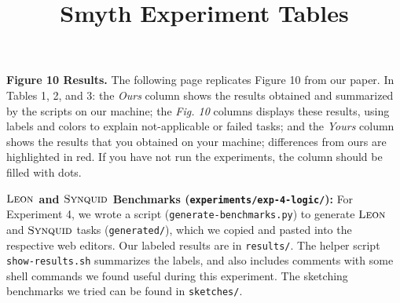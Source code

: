\documentclass[acmsmall,nonacm]{acmart}
\newcommand{\leon}
  {\ensuremath{\textsc{Leon}}}
\newcommand{\synquid}
  {\ensuremath{\textsc{Synquid}}}
\begin{document}
\title{Smyth Experiment Tables}
\maketitle

\vspace{0.30in}
\noindent
\textbf{Figure 10 Results.}
%
The following page replicates Figure 10 from our paper.
%
In Tables 1, 2, and 3:
%
the \textit{Ours} column shows the results obtained and summarized by
the scripts on our machine;
%
the \textit{Fig. 10} columns displays these results, using labels and
colors to explain not-applicable or failed tasks; and
%
the \textit{Yours} column shows the results that you obtained
on your machine; differences from ours are highlighted in red.
%
If you have not run the experiments, the column should be filled with dots.


\vspace{0.30in}
%
\noindent
%
\textbf{\leon{} and \synquid{} Benchmarks (\texttt{experiments/exp-4-logic/}):}
%
For Experiment 4, we wrote a script
%
(\texttt{generate-benchmarks.py})
%
to generate \leon{} and \synquid{} tasks
%
(\texttt{generated/}),
%
which we copied and pasted into the respective web editors.
%
Our labeled results are in \texttt{results/}.
%
The helper script \texttt{show-results.sh} summarizes the labels,
and also includes comments with some shell commands we found useful during
this experiment.
%
The sketching benchmarks we tried
can be found in \texttt{sketches/}.

\clearpage

\setcounter{figure}{9}


\setcounter{figure}{0}




\end{document}
